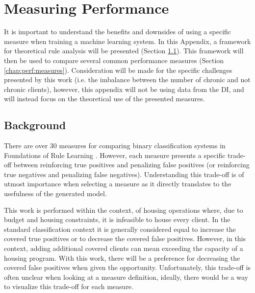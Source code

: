 \chapter{Measuring Performance} \label{chap:perf}



 It is important to understand the benefits and downsides of using a specific measure when training a machine learning system. In this Appendix, a framework for theoretical rule analysis \cite{furnkranz2005roc} will be presented (Section \ref{chap:perf:background}). This framework will then be used to compare several common performance measures (Section \ref{chap:perf:measures}). Consideration will be made for the specific challenges presented by this work (i.e. the imbalance between the number of chronic and not chronic clients), however, this appendix will not be using data from the DI, and will instead focus on the theoretical use of the presented measures. 


\section{Background} \label{chap:perf:background}

There are over 30 measures for comparing binary classification systems in Foundations of Rule Learning \cite{furnkranz2012foundations}. However, each measure presents a specific trade-off between reinforcing true positives and penalizing false positives (or reinforcing true negatives and penalizing false negatives). Understanding this trade-off is of utmost importance when selecting a measure as it directly translates to the usefulness of the generated model.

This work is performed within the context, of housing operations where, due to budget and housing constraints, it is infeasible to house every client. In the standard classification context it is generally considered equal to increase the covered true positives or to decrease the covered false positives. However, in this context, adding additional covered clients can mean exceeding the capacity of a housing program. With this work, there will be a preference for decreasing the covered false positives when given the opportunity. Unfortunately, this trade-off is often unclear when looking at a measure definition, ideally, there would be a way to visualize this trade-off for each measure.

